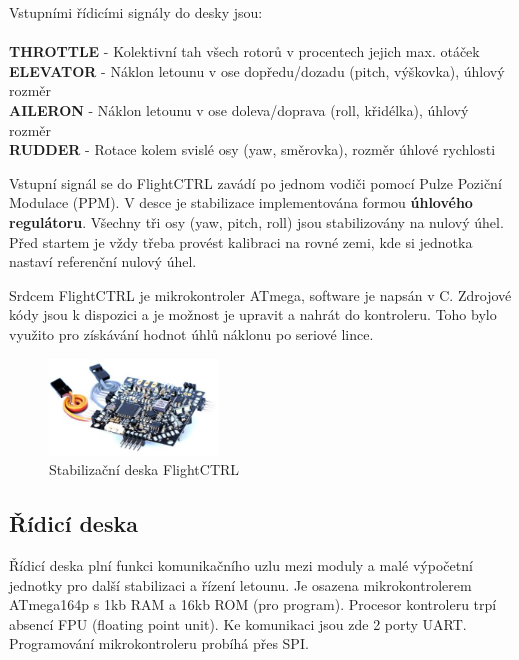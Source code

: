 \documentclass[11pt, a4paper]{article}
\begin{document}
Vstupními řídicími signály do desky jsou:
\\
\\
\textbf{THROTTLE} - Kolektivní tah všech rotorů v procentech jejich max. otáček\\
\textbf{ELEVATOR} - Náklon letounu v ose dopředu/dozadu (pitch, výškovka), úhlový rozměr\\
\textbf{AILERON} - Náklon letounu v ose doleva/doprava (roll, křidélka), úhlový rozměr\\
\textbf{RUDDER} - Rotace kolem svislé osy (yaw, směrovka), rozměr úhlové rychlosti

Vstupní signál se do FlightCTRL zavádí po jednom vodiči pomocí Pulze Poziční Modulace (PPM). V desce je stabilizace implementována formou \textbf{úhlového regulátoru}. Všechny tři osy (yaw, pitch, roll) jsou stabilizovány na nulový úhel. Před startem je vždy třeba provést kalibraci na rovné zemi, kde si jednotka nastaví referenční nulový úhel.

Srdcem FlightCTRL je mikrokontroler ATmega, software je napsán v C. Zdrojové kódy jsou k dispozici a je možnost je upravit a nahrát do kontroleru. Toho bylo využito pro získávání hodnot úhlů náklonu po seriové lince.

\begin{figure}[h]
\begin{center}
\includegraphics[width=0.4\textwidth]{fig/flightctrl.jpg}
\caption{Stabilizační deska FlightCTRL}
\label{fig:flightctrl}
\end{center}
\end{figure}

\newpage

\subsection{Řídicí deska}

Řídicí deska plní funkci komunikačního uzlu mezi moduly a malé výpočetní jednotky pro další stabilizaci a řízení letounu. Je osazena mikrokontrolerem ATmega164p s 1kb RAM a 16kb ROM (pro program). Procesor kontroleru trpí absencí FPU (floating point unit). Ke komunikaci jsou zde 2 porty UART. Programování mikrokontroleru probíhá přes SPI.
\end{document}
